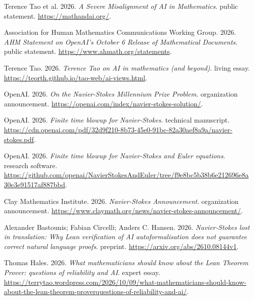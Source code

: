 {\begin{description}[leftmargin=2em,labelwidth=1.5em,itemsep=1pt,parsep=0pt]
\item[83.] \hypertarget{ref-mathmisalignment2026}{} Terence Tao et al. 2026. \textit{A Severe Misalignment of AI in Mathematics}. public statement. \url{https://mathandai.org/}.

\item[84.] \hypertarget{ref-ahm2026}{} Association for Human Mathematics Communications Working Group. 2026. \textit{AHM Statement on OpenAI's October 6 Release of Mathematical Documents}. public statement. \url{https://www.ahmath.org/statements}.

\item[85.] \hypertarget{ref-taoliving2026}{} Terence Tao. 2026. \textit{Terence Tao on AI in mathematics (and beyond)}. living essay. \url{https://teorth.github.io/tao-web/ai-views.html}.

\item[86.] \hypertarget{ref-openainavier2026}{} OpenAI. 2026. \textit{On the Navier-Stokes Millennium Prize Problem}. organization announcement. \url{https://openai.com/index/navier-stokes-solution/}.

\item[87.] \hypertarget{ref-openainavierpaper2026}{} OpenAI. 2026. \textit{Finite time blowup for Navier-Stokes}. technical manuscript. \url{https://cdn.openai.com/pdf/32d9f210-8b73-45e0-91bc-82a30aef8a9a/navier-stokes.pdf}.

\item[88.] \hypertarget{ref-openainaviercode2026}{} OpenAI. 2026. \textit{Finite time blowup for Navier-Stokes and Euler equations}. research software. \url{https://github.com/openai/NavierStokesAndEuler/tree/f9e8bc5b38b6e212696e8a30e3e91517af887bbd}.

\item[89.] \hypertarget{ref-claynavier2026}{} Clay Mathematics Institute. 2026. \textit{Navier-Stokes Announcement}. organization announcement. \url{https://www.claymath.org/news/navier-stokes-announcement/}.

\item[90.] \hypertarget{ref-naviertranslation2026}{} Alexander Bastounis; Fabian Circelli; Anders C. Hansen. 2026. \textit{Navier-Stokes lost in translation: Why Lean verification of AI autoformalisation does not guarantee correct natural language proofs}. preprint. \url{https://arxiv.org/abs/2610.08144v1}.

\item[91.] \hypertarget{ref-hales2026}{} Thomas Hales. 2026. \textit{What mathematicians should know about the Lean Theorem Prover: questions of reliability and AI}. expert essay. \url{https://terrytao.wordpress.com/2026/10/09/what-mathematicians-should-know-about-the-lean-theorem-proverquestions-of-reliability-and-ai/}.


\end{description}}
